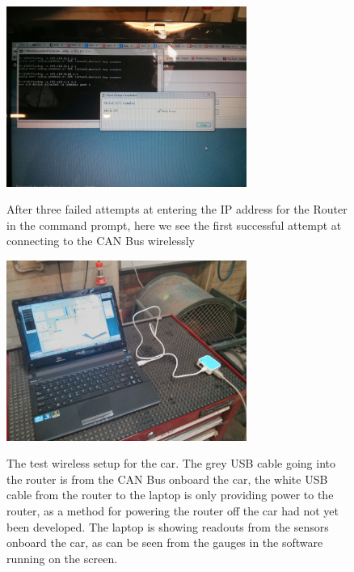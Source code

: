\begin{figure}[ht]
  \caption{After three failed attempts at entering the IP address for the Router in the command prompt, here we see the first successful attempt at connecting to the CAN Bus wirelessly}
  \centering
    \includegraphics[width=0.7\textwidth]{Images/Telemetry/TEL_usbip_installed.jpg}
    \label{TEL_usbip_installed}
\end{figure}

\begin{figure}[ht]
  \caption{The test wireless setup for the car. The grey USB cable going into the router is from the CAN Bus onboard the car, the white USB cable from the router to the laptop is only providing power to the router, as a method for powering the router off the car had not yet been developed. The laptop is showing readouts from the sensors onboard the car, as can be seen from the gauges in the software running on the screen.}
  \centering
    \includegraphics[width=0.7\textwidth]{Images/Telemetry/TEL_functioning.jpg}
    \label{TEL_functioning}
\end{figure}

